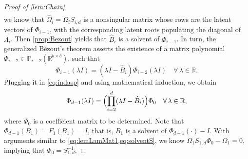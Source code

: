 \documentclass{article}
\newcommand{\poly}{\mathbb{P}}
\newcommand{\fp}{F}
\newcommand{\R}{\mathbb{R}}
\begin{document}
\begin{proof}[Proof of \cref{lem:Chain}]
\begin{equation}
\begin{aligned}
        \end{aligned}
    \end{equation}
    we know that $\widehat{\Omega}_{i}=\Omega_{i}S_{i,d}$ is a nonsingular matrix whose rows are the latent vectors of $\Phi_{i-1}$, with the corresponding latent roots populating the diagonal of $\Lambda_{i}$.
    Then \cref{prop:Bezout} yields that $\widehat{B}_{i}$ is a solvent of $\Phi_{i-1}$. In turn, the generalized B\'ezout's theorem asserts the existence of a matrix polynomial $\Phi_{i-2}\in\poly_{i-2}(\R^{b\times b})$, such that 
    \begin{equation*}
        \Phi_{i-1}(\lambda I) = (\lambda I-\widehat{B}_{i})\Phi_{i-2}(\lambda I)\quad \forall\,\lambda\in\R.
    \end{equation*}
    Plugging it in \cref{eq:indasp} and using mathematical induction, we obtain 
    \begin{equation*}
        \Phi_{d-1}(\lambda I) = \Bigl(\prod_{i=2}^{d}(\lambda I-\widehat{B}_{i})\Bigr)\Phi_{0}\quad \forall\,\lambda\in\R,
    \end{equation*}
    where $\Phi_{0}$ is a coefficient matrix to be determined. Note that $\Phi_{d-1}(B_{1}) = \fp_{1}(B_{1})=I$, that is, $B_{1}$ is a solvent of $\Phi_{d-1}(\cdot)-I$. With arguments similar to \cref{eq:lemLamMat1,eq:solventS}, we know $\Omega_{1}S_{1,d}\Phi_{0} - \Omega_{1} = 0$, implying that $\Phi_{0}=S_{1,d}^{-1}$.
\end{proof}
\end{document}
